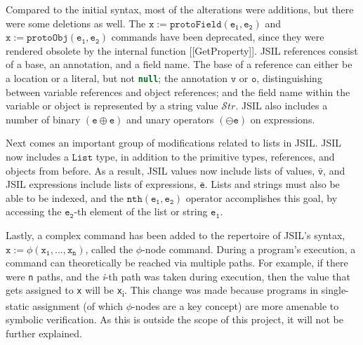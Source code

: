 \documentclass[a4paper,11pt,twoside]{report}
\def\jsinline{\lstinline[language=JavaScript, basicstyle=\small]}%\end{lstlisting}
\begin{document}
Compared to the initial syntax, most of the alterations were additions, but there were some deletions as well. The $\mathtt{x := protoField(e_1, e_2)}$ and $\mathtt{x := protoObj(e_1, e_2)}$ commands have been deprecated, since they were rendered obsolete by the internal function [[GetProperty]]. JSIL references consist of a base, an annotation, and a field name. The base of a reference can either be a location or a literal, but not \jsinline|null|; the annotation $\mathtt{v}$ or $\mathtt{o}$, distinguishing between variable references and object references; and the field name within the variable or object is represented by a string value $\mathcal{S}tr$. JSIL also includes a number of binary $(\mathtt{e} \oplus \mathtt{e})$ and unary operators $(\ominus \mathtt{e})$ on expressions.

Next comes an important group of modifications related to lists in JSIL. JSIL now includes a $\mathtt{List}$ type, in addition to the primitive types, references, and objects from before. As a result, JSIL values now include lists of values, $\bar{\mathtt{v}}$, and JSIL expressions include lists of expressions, $\bar{\mathtt{e}}$. Lists and strings must also be able to be indexed, and the $\mathtt{nth (e_1, e_2)}$ operator accomplishes this goal, by accessing the $\mathtt{e_2}$-th element of the list or string $\mathtt{e_1}$. 

Lastly, a complex command has been added to the repertoire of JSIL's syntax, $\mathtt{x} := \phi(\mathtt{x_1}, ... , \mathtt{x_n})$, called the $\phi$-node command. During a program's execution, a command can theoretically be reached via multiple paths. For example, if there were \texttt{n} paths, and the \textit{i}-th path was taken during execution, then the value that gets assigned to \texttt{x} will be \texttt{x}\textsubscript{i}. This change was made because programs in single-static assignment (of which $\phi$-nodes are a key concept) are more amenable to symbolic verification. As this is outside the scope of this project, it will not be further explained.
\end{document}
